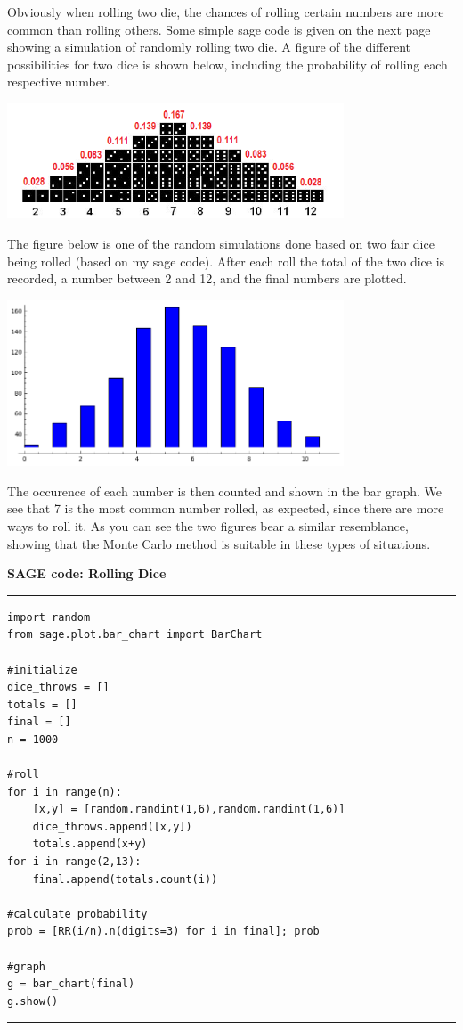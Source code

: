 \documentclass{article}
\begin{document}
Obviously when rolling two die, the chances of rolling certain numbers are more common than rolling others. Some simple sage code is given on the next page showing a simulation of randomly rolling two die. A figure of the different possibilities for two dice is shown below, including the probability of rolling each respective number.

\begin{center}
\includegraphics[width=0.75\textwidth]{monte3}
\end{center}

The figure below is one of the random simulations done based on two fair dice being rolled (based on my sage code). After each roll the total of the two dice is recorded, a number between 2 and 12, and the final numbers are plotted.

\begin{center}
\includegraphics[width=0.75\textwidth]{monte2}
\end{center}

The occurence of each number is then counted and shown in the bar graph. We see that 7 is the most common number rolled, as expected, since there are more ways to roll it.  As you can see the two figures bear a similar resemblance, showing that the Monte Carlo method is suitable in these types of situations.

\pagebreak

\noindent \textbf{SAGE code: Rolling Dice}

\noindent\rule{8cm}{0.4pt}
\begin{lstlisting}
import random
from sage.plot.bar_chart import BarChart

#initialize
dice_throws = []
totals = []
final = []
n = 1000

#roll
for i in range(n):
    [x,y] = [random.randint(1,6),random.randint(1,6)]
    dice_throws.append([x,y])
    totals.append(x+y)
for i in range(2,13):
    final.append(totals.count(i))

#calculate probability
prob = [RR(i/n).n(digits=3) for i in final]; prob

#graph
g = bar_chart(final)
g.show()
\end{lstlisting}
\noindent\rule{8cm}{0.4pt} \\
\end{document}

